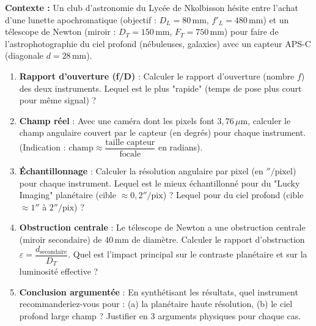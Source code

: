 \documentclass[11pt]{article}
\begin{document}
\begin{exercice}
\textbf{Contexte :} Un club d'astronomie du Lycée de Nkolbisson hésite entre l'achat d'une lunette apochromatique (objectif : $D_L = 80\,\text{mm}$, $f'_L = 480\,\text{mm}$) et un télescope de Newton (miroir : $D_T = 150\,\text{mm}$, $F_T = 750\,\text{mm}$) pour faire de l'astrophotographie du ciel profond (nébuleuses, galaxies) avec un capteur APS-C (diagonale $d = 28\,\text{mm}$).
\begin{enumerate}
    \item \textbf{Rapport d'ouverture (f/D)} : Calculer le rapport d'ouverture (nombre $f$) des deux instruments. Lequel est le plus "rapide" (temps de pose plus court pour même signal) ?
    \item \textbf{Champ réel} : Avec une caméra dont les pixels font $3,76\,\mu\text{m}$, calculer le champ angulaire couvert par le capteur (en degrés) pour chaque instrument. (Indication : $\text{champ} \approx \dfrac{\text{taille capteur}}{\text{focale}}$ en radians).
    \item \textbf{Échantillonnage} : Calculer la résolution angulaire par pixel (en $''/\text{pixel}$) pour chaque instrument. Lequel est le mieux échantillonné pour du "Lucky Imaging" planétaire (cible $\approx 0,2''/\text{pix}$) ? Lequel pour du ciel profond (cible $\approx 1''$ à $2''/\text{pix}$) ?
    \item \textbf{Obstruction centrale} : Le télescope de Newton a une obstruction centrale (miroir secondaire) de $40\,\text{mm}$ de diamètre. Calculer le rapport d'obstruction $\varepsilon = \dfrac{d_{\text{secondaire}}}{D_T}$. Quel est l'impact principal sur le contraste planétaire et sur la luminosité effective ?
    \item \textbf{Conclusion argumentée} : En synthétisant les résultats, quel instrument recommanderiez-vous pour : (a) la planétaire haute résolution, (b) le ciel profond large champ ? Justifier en 3 arguments physiques pour chaque cas.
\end{enumerate}
\end{exercice}
\end{document}
